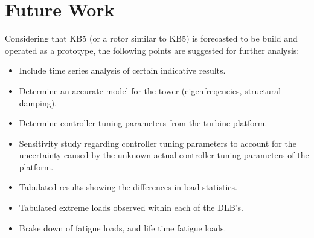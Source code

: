 \section{Future Work}
\label{sec:dlb:Future Work}

Considering that KB5 (or a rotor similar to KB5) is forecasted to be build and operated as a prototype, the following points are suggested for further analysis:

\begin{itemize}
	\item Include time series analysis of certain indicative results.
	\item Determine an accurate model for the tower (eigenfreqencies, structural damping).
	\item Determine controller tuning parameters from the turbine platform.
	\item Sensitivity study regarding controller tuning parameters to account for the uncertainty caused by the unknown actual controller tuning parameters of the platform.
	\item Tabulated results showing the differences in load statistics.
	\item Tabulated extreme loads observed within each of the DLB's.
	\item Brake down of fatigue loads, and life time fatigue loads.
\end{itemize}
